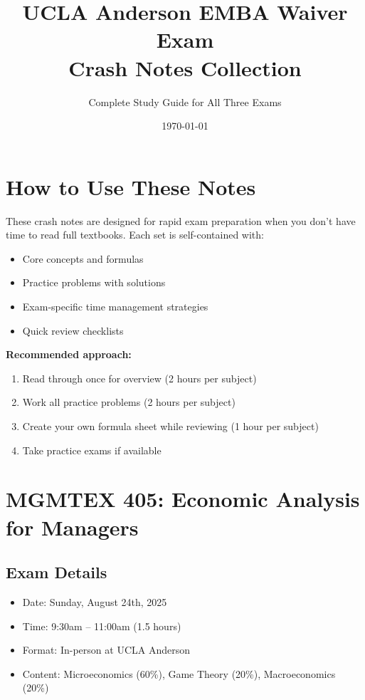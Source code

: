 \documentclass[11pt]{article}
\title{UCLA Anderson EMBA Waiver Exam\\Crash Notes Collection}
\author{Complete Study Guide for All Three Exams}
\date{\today}
\begin{document}
\maketitle
\tableofcontents
\newpage

\section{How to Use These Notes}
These crash notes are designed for rapid exam preparation when you don't have time to read full textbooks. Each set is self-contained with:
\begin{itemize}
\item Core concepts and formulas
\item Practice problems with solutions
\item Exam-specific time management strategies
\item Quick review checklists
\end{itemize}

\textbf{Recommended approach:}
\begin{enumerate}
\item Read through once for overview (2 hours per subject)
\item Work all practice problems (2 hours per subject)
\item Create your own formula sheet while reviewing (1 hour per subject)
\item Take practice exams if available
\end{enumerate}

\newpage
\section{MGMTEX 405: Economic Analysis for Managers}
\subsection{Exam Details}
\begin{itemize}
\item Date: Sunday, August 24th, 2025
\item Time: 9:30am – 11:00am (1.5 hours)
\item Format: In-person at UCLA Anderson
\item Content: Microeconomics (60\%), Game Theory (20\%), Macroeconomics (20\%)
\end{itemize}

\end{document}
